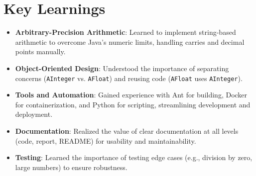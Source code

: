 \documentclass[a4paper,12pt]{article}
\begin{document}
\section{Key Learnings}
\begin{itemize}
    \item \textbf{Arbitrary-Precision Arithmetic}: Learned to implement string-based arithmetic to overcome Java’s numeric limits, handling carries and decimal points manually.
    \item \textbf{Object-Oriented Design}: Understood the importance of separating concerns (\texttt{AInteger} vs. \texttt{AFloat}) and reusing code (\texttt{AFloat} uses \texttt{AInteger}).
    \item \textbf{Tools and Automation}: Gained experience with Ant for building, Docker for containerization, and Python for scripting, streamlining development and deployment.
    \item \textbf{Documentation}: Realized the value of clear documentation at all levels (code, report, README) for usability and maintainability.
    \item \textbf{Testing}: Learned the importance of testing edge cases (e.g., division by zero, large numbers) to ensure robustness.
\end{itemize}
\end{document}
